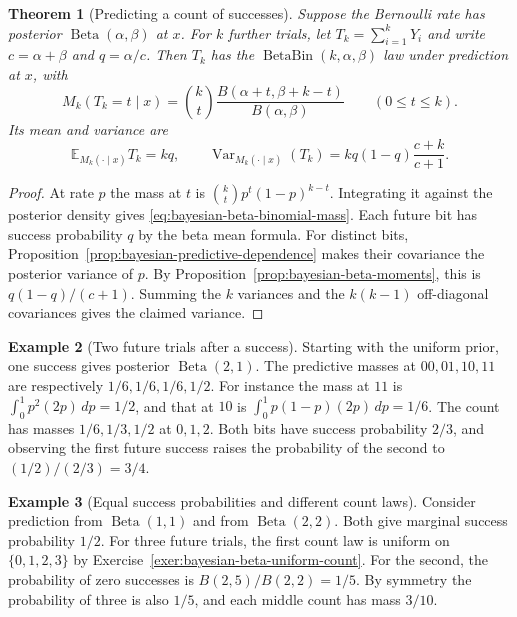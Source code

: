 \documentclass[11pt,oneside]{book}
\newtheorem{theorem}{Theorem}[chapter]
\theoremstyle{definition}
\newtheorem{example}[theorem]{Example}
\theoremstyle{remark}
\begin{document}
\begin{theorem}[Predicting a count of successes]
\label{thm:bayesian-predictive-count}
Suppose the Bernoulli rate has posterior $\operatorname{Beta}(\alpha,\beta)$
at $x$. For $k$ further trials, let $T_k=\sum_{i=1}^k Y_i$ and write
$c=\alpha+\beta$ and $q=\alpha/c$. Then $T_k$ has the
$\operatorname{BetaBin}(k,\alpha,\beta)$ law under prediction at $x$, with
\begin{equation}
M_k(T_k=t\mid x)=\binom kt\frac{B(\alpha+t,\beta+k-t)}{B(\alpha,\beta)}
\qquad(0\leq t\leq k).
\label{eq:bayesian-beta-binomial-mass}
\end{equation}
Its mean and variance are
\[
\mathbb E_{M_k(\cdot\mid x)}T_k=kq,\qquad
\operatorname{Var}_{M_k(\cdot\mid x)}(T_k)
=kq(1-q)\frac{c+k}{c+1}.
\]
\end{theorem}
\begin{proof}
At rate $p$ the mass at $t$ is $\binom kt p^t(1-p)^{k-t}$.
Integrating it against the posterior density gives
\eqref{eq:bayesian-beta-binomial-mass}. Each future bit has success
probability $q$ by the beta mean formula. For distinct bits,
Proposition~\ref{prop:bayesian-predictive-dependence} makes their
covariance the posterior variance of $p$. By
Proposition~\ref{prop:bayesian-beta-moments}, this is
$q(1-q)/(c+1)$. Summing the $k$ variances and the $k(k-1)$
off-diagonal covariances gives the claimed variance.
\end{proof}

\begin{example}[Two future trials after a success]
\label{ex:bayesian-beta-binomial-two-trials}
Starting with the uniform prior, one success gives posterior
$\operatorname{Beta}(2,1)$. The predictive masses at $00,01,10,11$
are respectively $1/6,1/6,1/6,1/2$. For instance the mass at $11$
is $\int_0^1 p^2(2p)\,dp=1/2$, and that at $10$ is
$\int_0^1 p(1-p)(2p)\,dp=1/6$. The count has masses
$1/6,1/3,1/2$ at $0,1,2$. Both bits have success probability
$2/3$, and observing the first future success raises the
probability of the second to $(1/2)/(2/3)=3/4$.
\end{example}

\begin{example}[Equal success probabilities and different count laws]
\label{ex:bayesian-beta-binomial-equal-marginals}
Consider prediction from $\operatorname{Beta}(1,1)$ and from
$\operatorname{Beta}(2,2)$. Both give marginal success probability
$1/2$. For three future trials, the first count law is uniform
on $\{0,1,2,3\}$ by Exercise~\ref{exer:bayesian-beta-uniform-count}.
For the second, the probability of zero successes is
$B(2,5)/B(2,2)=1/5$. By symmetry the probability of three is also
$1/5$, and each middle count has mass $3/10$.
\end{example}
\end{document}
